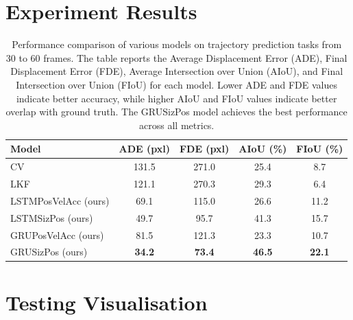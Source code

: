 \documentclass[12pt,oneside]{book} %
\begin{document}
\section{Experiment Results}

\begin{table}[H]
    \centering
    \caption{Performance comparison of various models on trajectory prediction tasks from 30 to 60 frames. The table reports the Average Displacement Error (ADE), Final Displacement Error (FDE), Average Intersection over Union (AIoU), and Final Intersection over Union (FIoU) for each model. Lower ADE and FDE values indicate better accuracy, while higher AIoU and FIoU values indicate better overlap with ground truth. The GRUSizPos model achieves the best performance across all metrics.}
    \begin{adjustbox}{max width=\textwidth}
        \begin{tabular}{lcccc}
            \toprule
            \textbf{Model}       & \textbf{ADE (pxl)} & \textbf{FDE (pxl)} & \textbf{AIoU (\%)} & \textbf{FIoU (\%)} \\ 
            \midrule
            CV                   & 131.5              & 271.0              & 25.4               & 8.7                \\
            LKF                  & 121.1              & 270.3              & 29.3               & 6.4                \\
            LSTMPosVelAcc (ours) & 69.1               & 115.0              & 26.6               & 11.2               \\
            LSTMSizPos (ours)    & 49.7               & 95.7               & 41.3               & 15.7               \\
            GRUPosVelAcc (ours)  & 81.5               & 121.3              & 23.3               & 10.7               \\
            GRUSizPos (ours)     & \textbf{34.2}      & \textbf{73.4}      & \textbf{46.5}      & \textbf{22.1}      \\
            \bottomrule
        \end{tabular}
    \end{adjustbox}
    \label{tab:fusion-gru-results}
\end{table}

\section{Testing Visualisation}
\end{document}
